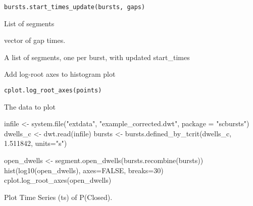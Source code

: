 \documentclass[letterpaper]{book}
\begin{document}
%
\begin{Usage}
\begin{verbatim}
bursts.start_times_update(bursts, gaps)
\end{verbatim}
\end{Usage}
%
\begin{Arguments}
\begin{ldescription}
\item[\code{bursts}] List of segments

\item[\code{gaps}] vector of gap times.
\end{ldescription}
\end{Arguments}
%
\begin{Value}
A list of segments, one per burst, with updated start\_times
\end{Value}
%
\begin{Description}\relax
Add log-root axes to histogram plot
\end{Description}
%
\begin{Usage}
\begin{verbatim}
cplot.log_root_axes(points)
\end{verbatim}
\end{Usage}
%
\begin{Arguments}
\begin{ldescription}
\item[\code{points}] The data to plot
\end{ldescription}
\end{Arguments}
%
\begin{Examples}
\begin{ExampleCode}

infile <- system.file("extdata", "example_corrected.dwt", package = "scbursts")
dwells_c <- dwt.read(infile)
bursts <- bursts.defined_by_tcrit(dwells_c, 1.511842, units="s")

open_dwells <- segment.open_dwells(bursts.recombine(bursts))
hist(log10(open_dwells), axes=FALSE, breaks=30)
cplot.log_root_axes(open_dwells)

\end{ExampleCode}
\end{Examples}
%
\begin{Description}\relax
Plot Time Series (ts) of P(Closed).
\end{Description}
\end{document}
